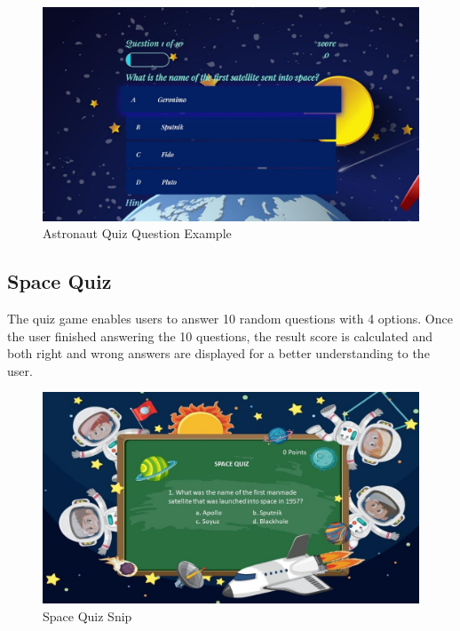 \documentclass[12pt]{article}
\begin{document}
    \begin{figure}[ht]
        \centering
            \includegraphics[height=0.3\textheight]{quizGameK2.jpg}
            \caption{Astronaut Quiz Question Example}
    \end{figure}
    
    \newpage

    \subsection{Space Quiz}

    The quiz game enables users to answer 10 random questions with 4 options. Once the user finished answering the 10 questions, the result score is calculated and both right and wrong answers are displayed for a better understanding to the user.

    \begin{figure}[ht]
        \centering
            \includegraphics[height=0.3\textheight]{spacequiz.jpg}
            \caption{Space Quiz Snip}
    \end{figure}
\end{document}
